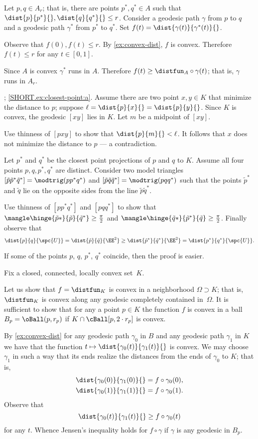 Let $p,q\in A_r$;
that is, there are points $p^*,q^*\in A$ such that $\dist{p}{p^*}{},\dist{q}{q^*}{}\le r$.
Consider a geodesic path $\gamma$ from $p$ to $q$ and a geodesic path $\gamma^*$ from $p^*$ to $q^*$.
Set $f(t)=\dist{\gamma(t)}{\gamma^*(t)}{}$.

Observe that $f(0),f(t)\le r$.
By \ref{ex:convex-dist}, $f$ is convex.
Therefore $f(t)\le r$ for any $t\in[0,1]$.

Since $A$ is convex $\gamma^*$ runs in $A$.
Therefore $f(t)\ge \distfun_A\circ\gamma(t)$;
that is, $\gamma$  runs in $A_r$.

; \ref{SHORT.ex:closest-point:a}.
Assume there are two point $x,y\in K$ that minimize the distance to $p$;
suppose $\ell=\dist{p}{x}{}=\dist{p}{y}{}$.
Since $K$ is convex, the geodesic $[xy]$ lies in $K$.
Let $m$ be a midpoint of $[xy]$.

Use thinness of $[pxy]$ to show that $\dist{p}{m}{}<\ell$.
It follows that $x$ does not minimize the distance to $p$ --- a contradiction.

Let $p^*$ and $q^*$ be the closest point projections of $p$ and $q$ to $K$.
Assume all four points $p,q,p^*,q^*$ are distinct.
Consider two model triangles $[\tilde p\tilde p^*\tilde q^*]=\modtrig(pp^*q^*)$ and $[\tilde p\tilde q\tilde q^*]=\modtrig(pqq^*)$ 
such that the points $\tilde p^*$ and $\tilde q$ lie on the opposite sides from the line $\tilde p\tilde q^*$.

Use thinness of $[pp^*q^*]$ and $[pqq^*]$ to show that $\mangle\hinge{\tilde p*}{\tilde p}{\tilde q^*}\ge \tfrac\pi2$ and $\mangle\hinge{\tilde q*}{\tilde p^*}{\tilde q}\ge \tfrac\pi2$.
Finally observe that 
\[\dist{p}{q}{\spc{U}}=\dist{\tilde p}{\tilde q}{\EE^2}\ge \dist{\tilde p^*}{\tilde q^*}{\EE^2}=\dist{p^*}{q^*}{\spc{U}}.\]

If some of the points $p$, $q$, $p^*$, $q^*$ coincide, then the proof is easier.

 Fix a closed, connected, locally convex set~$K$.

Let us show that $f=\distfun_K$ is convex in a neighborhood $\Omega\supset K$; that is, $\distfun_K$ is convex along any geodesic completely contained in~$\Omega$.
It is sufficient to show that for any a point $p\in K$ the function $f$ is convex in a ball $B_p= \oBall(p, r_p)$ if $K\cap \cBall[p,2\cdot r_p]$ is convex.

By \ref{ex:convex-dist} for any geodesic path $\gamma_0$ in $B$ and any geodesic path $\gamma_1$ in $K$ we have that the function 
$t\mapsto\dist{\gamma_0(t)}{\gamma_1(t)}{}$ is convex.
We may choose $\gamma_1$ in such a way that its ends realize the distances from the ends of $\gamma_0$ to $K$;
that is,
\begin{align*}
\dist{\gamma_0(0)}{\gamma_1(0)}{}&=f\circ\gamma_0(0),
\\
\dist{\gamma_0(1)}{\gamma_1(1)}{}&=f\circ\gamma_0(1).
\end{align*}
Observe that 
\[\dist{\gamma_0(t)}{\gamma_1(t)}{}\ge f\circ\gamma_0(t)\]
for any $t$.
Whence Jensen's inequality holds for $f\circ\gamma$ if $\gamma$ is any geodesic in $B_p$.

